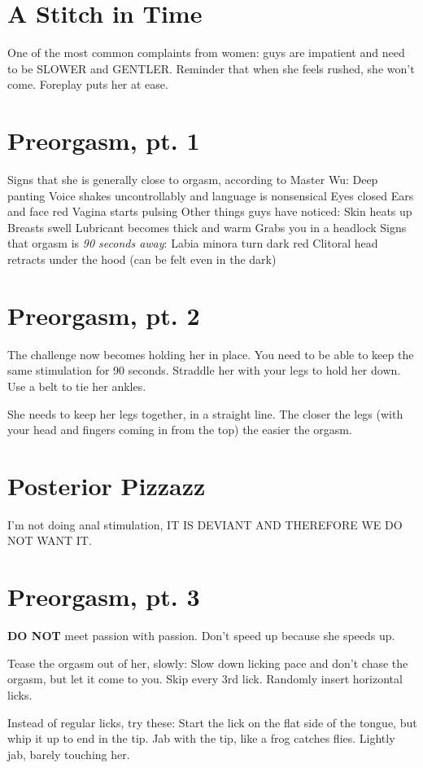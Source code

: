 \section{A Stitch in Time}
\begin{outline}
\1 One of the most common complaints from women: guys are impatient and need to be SLOWER and GENTLER.
\1 Reminder that when she feels rushed, she won't come. Foreplay puts her at ease.
\end{outline}

\section{Preorgasm, pt. 1}
\begin{outline}
\1 Signs that she is generally close to orgasm, according to Master Wu:
	\2 Deep panting
	\2 Voice shakes uncontrollably and language is nonsensical
	\2 Eyes closed
	\2 Ears and face red
	\2 Vagina starts pulsing
\1 Other things guys have noticed:
	\2 Skin heats up
	\2 Breasts swell
	\2 Lubricant becomes thick and warm
	\2 Grabs you in a headlock
\1 Signs that orgasm is \emph{90 seconds away}:
	\2 Labia minora turn dark red
	\2 Clitoral head retracts under the hood (can be felt even in the dark)
\end{outline}

\section{Preorgasm, pt. 2}
\begin{outline}
\1 The challenge now becomes holding her in place. You need to be able to keep the same stimulation for 90 seconds.
	\2 Straddle her with your legs to hold her down.
	\2 Use a belt to tie her ankles.

\1 She needs to keep her legs together, in a straight line. The closer the legs (with your head and fingers coming in from the top) the easier the orgasm.
\end{outline}

\section{Posterior Pizzazz}
I'm not doing anal stimulation, IT IS DEVIANT AND THEREFORE WE DO NOT WANT IT.

\section{Preorgasm, pt. 3}
\textbf{DO NOT} meet passion with passion. Don't speed up because she speeds up.
\begin{outline}
\1 Tease the orgasm out of her, slowly:
	\2 Slow down licking pace and don't chase the orgasm, but let it come to you.
	\2 Skip every 3rd lick.
	\2 Randomly insert horizontal licks.

\1 Instead of regular licks, try these:
	\2 Start the lick on the flat side of the tongue, but whip it up to end in the tip.
	\2 Jab with the tip, like a frog catches flies.
	\2 Lightly jab, barely touching her.
\end{outline}


